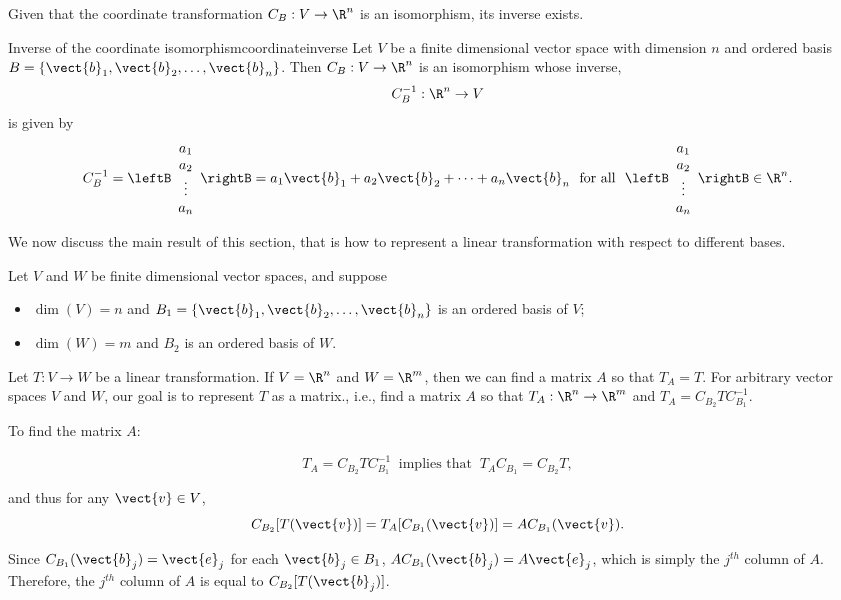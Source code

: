 Given that the coordinate transformation $C_B:V\to\R^n$ is an isomorphism, its inverse exists. 

\begin{theorem}{Inverse of the coordinate isomorphism}{coordinateinverse}
Let $V$ be a finite dimensional vector space with dimension $n$
and ordered basis $B=\{\vect{b}_1, \vect{b}_2, \ldots, \vect{b}_n\}$.
Then $C_B:V\to\R^n$ is an isomorphism whose inverse,
\[ C_B^{-1}:\R^n\to V\]
is given by
\[  C_B^{-1} =\leftB\begin{array}{c}
a_1 \\ a_2 \\ \vdots \\ a_n \end{array}\rightB =
a_1\vect{b}_1 + a_2\vect{b}_2 + \cdots + a_n\vect{b}_n
~\mbox{ for all }~
\leftB\begin{array}{c}
a_1 \\ a_2 \\ \vdots \\ a_n \end{array}\rightB \in\R^n.  \]
\end{theorem}

We now discuss the main result of this section, that is how
to represent a linear transformation with respect to different
bases.

Let $V$ and $W$ be finite dimensional vector spaces, and suppose
\begin{itemize}
\item $\dim(V)=n$ and $B_1=\{\vect{b}_1, \vect{b}_2, \ldots, \vect{b}_n\}$
is an ordered basis of $V$;
\item $\dim(W)=m$ and $B_2$ is an ordered basis of $W$.
\end{itemize}
Let $T:V\to W$ be a linear transformation.
If $V=\R^n$ and $W=\R^m$, then we can find a
matrix $A$ so that $T_A=T$. For arbitrary vector spaces $V$ and $W$, 
our goal is to represent $T$ as a matrix.,
i.e., 
find a matrix $A$ so that $T_A:\R^n\to\R^m$
and $T_A=C_{B_2}TC_{B_1}^{-1}$.

To find the matrix $A$:

\[ T_A=C_{B_2}TC_{B_1}^{-1}~\mbox{ implies that }~
T_AC_{B_1}=C_{B_2}T,\]

and thus for any $\vect{v}\in V$, 
\[ C_{B_2}[T(\vect{v})] = T_A[C_{B_1}(\vect{v})] 
=AC_{B_1}(\vect{v}).\]

Since $C_{B_1}(\vect{b}_j)=\vect{e}_j$
for each $\vect{b}_j\in B_1$,
$AC_{B_1}(\vect{b}_j)=A\vect{e}_j$, which is simply the
$j^{th}$ column of $A$.
Therefore, the $j^{th}$ column of $A$ is equal to $C_{B_2}[T(\vect{b}_j)]$.


